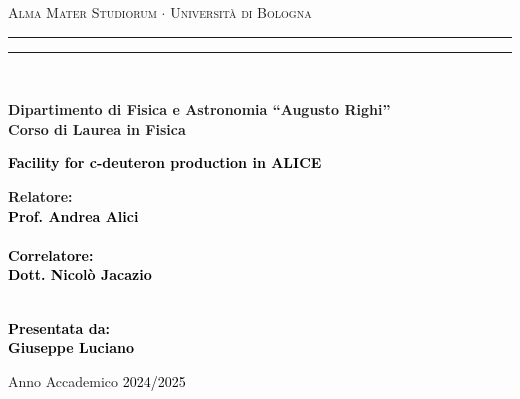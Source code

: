 \documentclass[12pt,a4paper]{book}
\begin{document}
	\begin{titlepage}
		\begin{center}
			{{\Large{\textsc{Alma Mater Studiorum $\cdot$ Universit\`a di Bologna}}}} 
			\rule[0.1cm]{15.8cm}{0.1mm}
			\rule[0.5cm]{15.8cm}{0.6mm}
			\\\vspace{3mm}
			
			{\small{\bf Dipartimento di Fisica e Astronomia “Augusto Righi”\\
					Corso di Laurea in Fisica}}
			
		\end{center}
		
		\vspace{23mm}
		
		\begin{center}\textcolor{black}{
				{\LARGE{\bf Facility for c-deuteron production in ALICE}}\\
		}\end{center}
		
		\vspace{50mm} \par \noindent
		
		\begin{minipage}[t]{0.47\textwidth}
			{\large{\bf Relatore: \vspace{2mm}\\\textcolor{black}{
						Prof. Andrea Alici}\\\\
					\textcolor{black}{
						\bf Correlatore: 
						\vspace{2mm}\\
						Dott. Nicolò Jacazio \\\\}}}
		\end{minipage}
		\hfill
		\begin{minipage}[t]{0.47\textwidth}\raggedleft \textcolor{black}{
				{\large{\bf Presentata da:
						\vspace{2mm}\\
						Giuseppe Luciano}}}
		\end{minipage}
		
		\vspace{40mm}
		
		\begin{center}
			Anno Accademico \textcolor{black}{ 2024/2025}
		\end{center}
		
	\end{titlepage}
		
\end{document}
